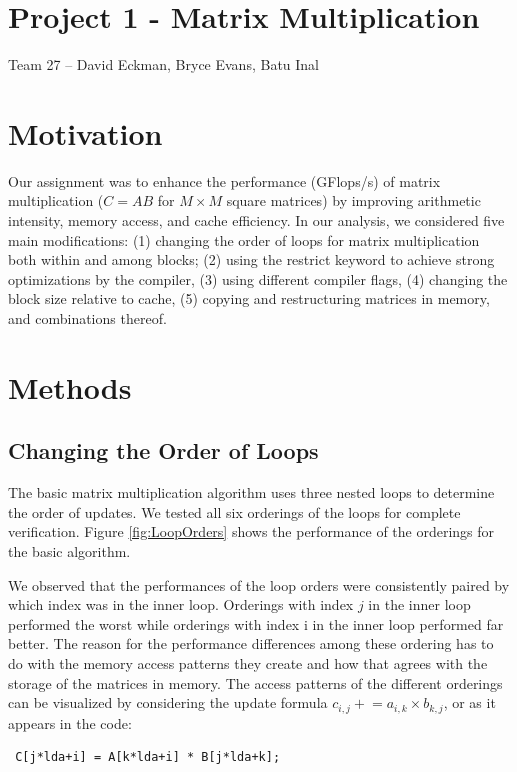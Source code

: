 \documentclass[12pt]{article}
\begin{document}
\setlength{\parindent}{24pt}


\section*{Project 1 - Matrix Multiplication}
Team 27 \--- David Eckman, Bryce Evans, Batu Inal

\section{Motivation}

Our assignment was to enhance the performance (GFlops/s) of matrix multiplication ($C = AB$ for $M \times M$ square matrices) by improving arithmetic intensity, memory access, and cache efficiency.
In our analysis, we considered five main modifications: (1) changing the order of loops for matrix multiplication both within and among blocks; (2) using the restrict keyword to achieve strong optimizations by the compiler, (3) using different compiler flags, (4) changing the block size relative to cache, (5) copying and restructuring matrices in memory, and combinations thereof.

\section{Methods}

\subsection{Changing the Order of Loops}

The basic matrix multiplication algorithm uses three nested loops to determine the order of updates.
We tested all six orderings of the loops for complete verification. 
Figure \ref{fig:LoopOrders} shows the performance of the orderings for the basic algorithm.

We observed that the performances of the loop orders were consistently paired by which index was in the inner loop.
Orderings with index $j$ in the inner loop performed the worst while orderings with index i in the inner loop performed far better.
The reason for the performance differences among these ordering has to do with the memory access patterns they create and how that agrees with the storage of the matrices in memory.
The access patterns of the different orderings can be visualized by considering the update formula $c_{i,j} \mathrel{+}= a_{i,k} \times b_{k,j}$, or as it appears in the code:
\begin{verbatim} C[j*lda+i] = A[k*lda+i] * B[j*lda+k];\end{verbatim}
\end{document}
